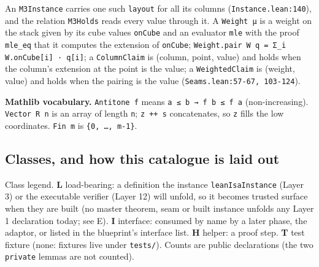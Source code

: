 An \texttt{M3Instance} carries one such \texttt{layout} for all its columns (\texttt{Instance.\allowbreak{}lean:140}), and the relation \texttt{M3Holds} reads every value through it. A \texttt{Weight μ} is a weight on the stack given by its cube values \texttt{onCube} and an evaluator \texttt{mle} with the proof \texttt{mle\_\allowbreak{}eq} that it computes the extension of \texttt{onCube}; \texttt{W\allowbreak{}e\allowbreak{}i\allowbreak{}g\allowbreak{}h\allowbreak{}t\allowbreak{}.\allowbreak{}p\allowbreak{}a\allowbreak{}i\allowbreak{}r\allowbreak{} W\allowbreak{} q\allowbreak{} =\allowbreak{} Σ\allowbreak{}\_\allowbreak{}i\allowbreak{} W\allowbreak{}.\allowbreak{}o\allowbreak{}n\allowbreak{}C\allowbreak{}u\allowbreak{}b\allowbreak{}e\allowbreak{}[\allowbreak{}i\allowbreak{}]\allowbreak{} ·\allowbreak{} q\allowbreak{}[\allowbreak{}i\allowbreak{}]}; a \texttt{ColumnClaim} is (column, point, value) and holds when the column's extension at the point is the value; a \texttt{WeightedClaim} is (weight, value) and holds when the pairing is the value (\texttt{Seams.\allowbreak{}lean:57-{}67,\allowbreak{} 103-{}124}).

\textbf{Mathlib vocabulary.} \texttt{Antitone f} means \texttt{a ≤ b → f b ≤ f a} (non-increasing). \texttt{Vector R n} is an array of length \texttt{n}; \texttt{z ++ s} concatenates, so \texttt{z} fills the low coordinates. \texttt{Fin m} is \texttt{\{0,\allowbreak{} …,\allowbreak{} m-{}1\}}.

\subsection{Classes, and how this catalogue is laid out}

\par{}\par

Class legend. \textbf{L} load-bearing: a definition the instance \texttt{leanIsaInstance} (Layer 3) or the executable verifier (Layer 12) will unfold, so it becomes trusted surface when they are built (no master theorem, seam or built instance unfolds any Layer 1 declaration today; see E). \textbf{I} interface: consumed by name by a later phase, the adaptor, or listed in the blueprint's interface list. \textbf{H} helper: a proof step. \textbf{T} test fixture (none: fixtures live under \texttt{tests/}). Counts are public declarations (the two \texttt{private} lemmas are not counted).

